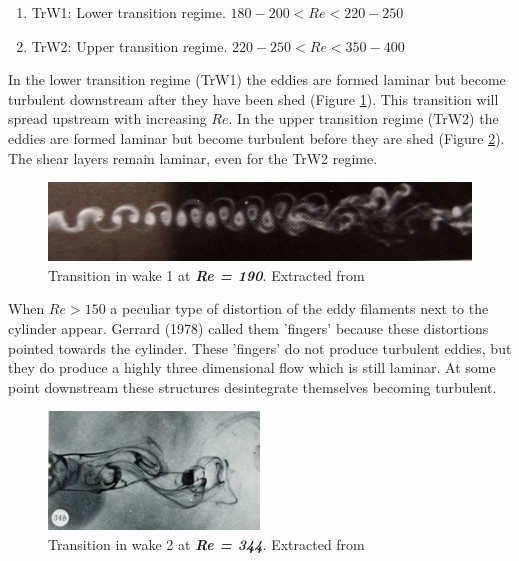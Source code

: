 \documentclass[journal]{new-aiaa}
\begin{document}
\begin{enumerate}[label=(\roman*)]
\item TrW1: Lower transition regime. $180-200<Re<220-250$
\item TrW2: Upper transition regime. $220-250<Re<350-400$
\end{enumerate}

In the lower transition regime (TrW1) the eddies are formed laminar but become turbulent downstream after they have been shed (Figure \ref{fig:TrW1}). This transition will spread upstream with increasing $Re$. In the upper transition regime (TrW2) the eddies are formed laminar but become turbulent before they are shed (Figure \ref{fig:TrW2}). The shear layers remain laminar, even for the TrW2 regime.

\begin{figure}[H]
\begin{center}
\includegraphics[width=1\textwidth]{Images/federico/Figure03}
\caption{Transition in wake 1 at \textbf{\textit{Re = 190}}. Extracted from \cite{Zdravkovich1968} }
\label{fig:TrW1}
\end{center}
\end{figure}

When $Re>150$ a peculiar type of distortion of the eddy filaments next to the cylinder appear. Gerrard (1978) \cite{Gerrard1978} called them 'fingers' because these distortions pointed towards the cylinder. These 'fingers' do not produce turbulent eddies, but they do produce a highly three dimensional flow which is still laminar. At some point downstream these structures desintegrate themselves becoming turbulent.


\begin{figure}[H]
\begin{center}
\includegraphics[width=0.5\textwidth]{Images/federico/Figure04}
\caption{Transition in wake 2 at \textbf{\textit{Re = 344}}. Extracted from \cite{Gerrard1978} }
\label{fig:TrW2}
\end{center}
\end{figure}
\end{document}
